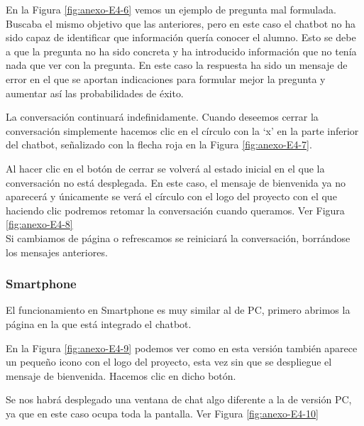 
En la Figura \ref{fig:anexo-E4-6} vemos un ejemplo de pregunta mal formulada. Buscaba el mismo objetivo que las anteriores, pero en este caso el chatbot no ha sido capaz de identificar que información quería conocer el alumno. Esto se debe a que la pregunta no ha sido concreta y ha introducido información que no tenía nada que ver con la pregunta. En este caso la respuesta ha sido un mensaje de error en el que se aportan indicaciones para formular mejor la pregunta y aumentar así las probabilidades de éxito.


La conversación continuará indefinidamente. Cuando deseemos cerrar la conversación simplemente hacemos clic en el círculo con la `x' en la parte inferior del chatbot, señalizado con la flecha roja en la Figura \ref{fig:anexo-E4-7}.



Al hacer clic en el botón de cerrar se volverá al estado inicial en el que la conversación no está desplegada. En este caso, el mensaje de bienvenida ya no aparecerá y únicamente se verá el círculo con el logo del proyecto con el que haciendo clic podremos retomar la conversación cuando queramos. Ver Figura \ref{fig:anexo-E4-8}\\
Si cambiamos de página o refrescamos se reiniciará la conversación, borrándose los mensajes anteriores.
 
\newpage
\subsubsection{Smartphone}

El funcionamiento en Smartphone es muy similar al de PC, primero abrimos la página en la que está integrado el chatbot. 


En la Figura \ref{fig:anexo-E4-9} podemos ver como en esta versión también aparece un pequeño icono con el logo del proyecto, esta vez sin que se despliegue el mensaje de bienvenida. Hacemos clic en dicho botón.

\newpage

Se nos habrá desplegado una ventana de chat algo diferente a la de versión PC, ya que en este caso ocupa toda la pantalla. Ver Figura \ref{fig:anexo-E4-10}

